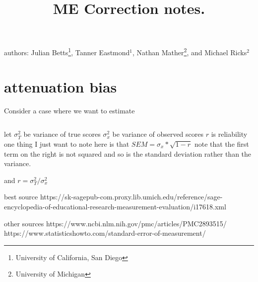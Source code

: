 \documentclass[letterpaper,12pt]{article}
\title{ME Correction notes. }
\begin{document}

\maketitle
\noindent authors: Julian Betts\footnote{University of California, San Diego}, Tanner Eastmond$^1$, Nathan Mather\footnote{University of Michigan}, and Michael Ricks$^2$

\section{attenuation bias}

Consider a case where we want to estimate 

\begin{equation*}
    
\end{equation*}

let $ \sigma^2_T$ be variance of true scores 
$\sigma^2_x$ be variance of observed scores 
$r$ is reliability
one thing I just want to note here is that $SEM = \sigma_x * \sqrt{1-r}$
note that the first term on the right is not squared and so is the standard deviation rather than the variance. 

and $ r  =  \sigma^2_T/\sigma^2_x $

best source 
https://sk-sagepub-com.proxy.lib.umich.edu/reference/sage-encyclopedia-of-educational-research-measurement-evaluation/i17618.xml

other sources 
https://www.ncbi.nlm.nih.gov/pmc/articles/PMC2893515/
https://www.statisticshowto.com/standard-error-of-measurement/


    
\end{document}
